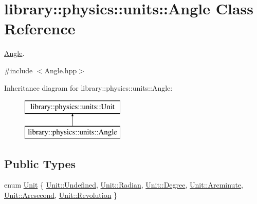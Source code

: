 \hypertarget{classlibrary_1_1physics_1_1units_1_1_angle}{}\section{library\+:\+:physics\+:\+:units\+:\+:Angle Class Reference}
\label{classlibrary_1_1physics_1_1units_1_1_angle}


\hyperlink{classlibrary_1_1physics_1_1units_1_1_angle}{Angle}.  




{\ttfamily \#include $<$Angle.\+hpp$>$}

Inheritance diagram for library\+:\+:physics\+:\+:units\+:\+:Angle\+:\begin{figure}[H]
\begin{center}
\leavevmode
\includegraphics[height=2.000000cm]{classlibrary_1_1physics_1_1units_1_1_angle}
\end{center}
\end{figure}
\subsection*{Public Types}
\begin{DoxyCompactItemize}
\item 
enum \hyperlink{classlibrary_1_1physics_1_1units_1_1_angle_a3c329d415a61783b16ce481874cc5956}{Unit} \{ \newline
\hyperlink{classlibrary_1_1physics_1_1units_1_1_angle_a3c329d415a61783b16ce481874cc5956aec0fc0100c4fc1ce4eea230c3dc10360}{Unit\+::\+Undefined}, 
\hyperlink{classlibrary_1_1physics_1_1units_1_1_angle_a3c329d415a61783b16ce481874cc5956a50c62e3ca8d8ec8732a7f968a3bf2c7c}{Unit\+::\+Radian}, 
\hyperlink{classlibrary_1_1physics_1_1units_1_1_angle_a3c329d415a61783b16ce481874cc5956a6669c4dc00cb161446821b3529ca07d8}{Unit\+::\+Degree}, 
\hyperlink{classlibrary_1_1physics_1_1units_1_1_angle_a3c329d415a61783b16ce481874cc5956a6d59f6ca1b5de72cbdc10a6792bcf090}{Unit\+::\+Arcminute}, 
\newline
\hyperlink{classlibrary_1_1physics_1_1units_1_1_angle_a3c329d415a61783b16ce481874cc5956a7839ceecae19481f2e21e0ce3e11d3aa}{Unit\+::\+Arcsecond}, 
\hyperlink{classlibrary_1_1physics_1_1units_1_1_angle_a3c329d415a61783b16ce481874cc5956aad09b2d48b2811c68e5a2bf421f7f2f2}{Unit\+::\+Revolution}
 \}
\end{DoxyCompactItemize}
